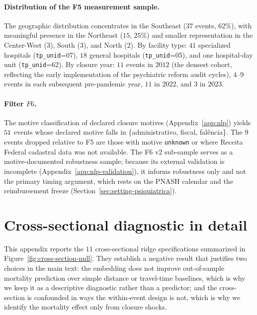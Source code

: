\paragraph{Distribution of the F5 measurement sample.} The geographic
distribution concentrates in the Southeast ($37$ events, $62\%$), with
meaningful presence in the Northeast ($15$, $25\%$) and smaller
representation in the Center-West ($3$), South ($3$), and North ($2$).
By facility type: $41$ specialized hospitals (\texttt{tp\_unid}=07),
$18$ general hospitals (\texttt{tp\_unid}=05), and one hospital-day
unit (\texttt{tp\_unid}=62). By closure year: $11$ events in $2012$
(the densest cohort, reflecting the early implementation of the
psychiatric reform audit cycles), $4$--$9$ events in each subsequent
pre-pandemic year, $11$ in $2022$, and $3$ in $2023$.

\paragraph{Filter $F6$.} The motive classification of declared closure
motives (Appendix~\ref{app:nlp}) yields $51$ events whose declared
motive falls in \{administrativo, fiscal, fal\^encia\}. The $9$ events
dropped relative to F5 are those with motive \texttt{unknown} or where
Receita Federal cadastral data was not available. The F6 v2 sub-sample
serves as a motive-documented robustness sample; because its external
validation is incomplete (Appendix~\ref{app:nlp-validation}), it informs
robustness only and not the primary timing argument, which rests on the
PNASH calendar and the reimbursement freeze
(Section~\ref{sec:setting-psiquiatrica}).

\section{Cross-sectional diagnostic in detail}
\label{app:xs}

This appendix reports the $11$ cross-sectional ridge specifications
summarized in Figure~\ref{fig:cross-section-null}. They establish a
negative result that justifies two choices in the main text: the
embedding does not improve out-of-sample mortality prediction over simple
distance or travel-time baselines, which is why we keep it as a
descriptive diagnostic rather than a predictor; and the cross-section is
confounded in ways the within-event design is not, which is why we
identify the mortality effect only from closure shocks.

